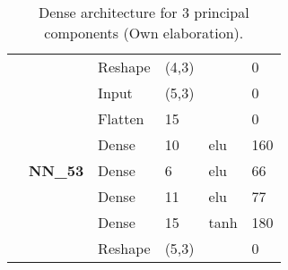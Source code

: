 \begin{table}[H]
\begin{center}
\begin{tabular}{ll|l|l|l|l|}
\multicolumn{1}{|l|}{}                                                                       &                                  & Reshape                            & (4,3)                                &                                          & 0                                           \\ \cline{2-6} 
\multicolumn{1}{|l|}{}                                                                       & \multirow{7}{*}{\textbf{NN\_53}} & Input                              & (5,3)                                &                                          & 0                                           \\ \cline{3-6} 
\multicolumn{1}{|l|}{}                                                                       &                                  & Flatten                            & 15                                   &                                          & 0                                           \\ \cline{3-6} 
\multicolumn{1}{|l|}{}                                                                       &                                  & Dense                              & 10                                   & elu                                     & 160                                         \\ \cline{3-6} 
\multicolumn{1}{|l|}{}                                                                       &                                  & Dense                              & 6                                    & elu                                     & 66                                          \\ \cline{3-6} 
\multicolumn{1}{|l|}{}                                                                       &                                  & Dense                              & 11                                   & elu                                     & 77                                          \\ \cline{3-6} 
\multicolumn{1}{|l|}{}                                                                       &                                  & Dense                              & 15                                   & tanh                                     & 180                                         \\ \cline{3-6} 
\multicolumn{1}{|l|}{}                                                                       &                                  & Reshape                            & (5,3)                                &                                          & 0                                          \\ \hline
\end{tabular}
\end{center}
\caption{Dense architecture for 3 principal components (Own elaboration).}
\label{table:nn_3}
\end{table}

